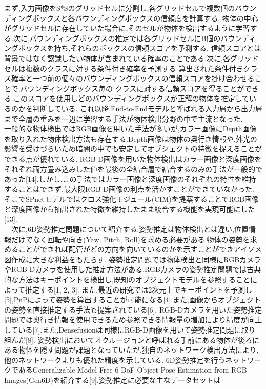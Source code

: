 まず,入力画像をS*Sのグリッドセルに分割し,各グリッドセルで複数個のバウンディングボックスと各バウンディングボックスの信頼度を計算する.
物体の中心がグリッドセルに存在していた場合に,そのセルが物体を検出するように学習する.次に,バウンディングボックスの推定では各グリッドセルにB個のバウンディングボックスを持ち,それらのボックスの信頼スコアを予測する.
信頼スコアとは背景ではなく認識したい物体が含まれている確率のことである.次に,各グリッドセルは複数のクラスに対する条件付き確率を予測する
算出された条件付きクラス確率と一つ前の個々のバウンディングボックスの信頼スコアを掛け合わせることで,バウンディングボックス毎の
クラスに対する信頼スコアを得ることができる.このスコアを使用しどのバウンディングボックスが正解の物体を推定しているのかを判断している.
これ以降,End-to-Endモデルと呼ばれる入力層から出力層まで全層の重みを一辺に学習する手法が物体検出分野の中で主流となった.\\
一般的な物体検出ではRGB画像を用いた手法が多いが,カラー画像にDepth画像を取り入れた物体検出方法も存在する.Depth画像は物体の奥行き情報や,外光の影響を受けづらいため暗闇の中でも安定してオブジェクトの特徴を捉えることができる点が優れている.
RGB-D画像を用いた物体検出はカラー画像と深度画像をそれぞれ両方畳み込みした値を最後の全結合層で結合するのみの手法が一般的であった[14].しかし,この手法ではカラー画像と深度画像のそれぞれの特性を維持することはできず,最大限RGB-D画像の利点を活かすことができていなかった.
そこでSPnetモデルではクロス強化モジュール(CIM)を提案することでRGB画像と深度画像から抽出された特徴を維持したまま統合する機能を実現可能にした[13].\\
　次に,6D姿勢推定問題について紹介する.姿勢推定は物体検出とは違い,位置情報だけでなく回転や向き(Yaw, Pitch, Roll)を求める必要がある.物体の姿勢を求めることができれば配管がどの方向を向いているのかを示すことができアイソメ図作成に大きな利益をもたらす.
姿勢推定問題では物体検出と同様にRGBカメラやRGB-Dカメラを使用した推定方法がある.RGBカメラの姿勢推定問題では古典的な方法はキーポイントを検出し,既知のオブジェクトモデルを参照することによって推定する[1, 2, 3].
また,最近の研究では2次元上でキーポイントを予測し[5],PnPによって姿勢を算出することが可能になる[4].また,画像からオブジェクトの姿勢を直接推定する手法も提案されている[6].
RGB-Dカメラを用いた姿勢推定問題では奥行き情報を使用できるため参照できる情報量の増加により精度が向上している[7].また,Densefusionは同様にRGB-D画像を用いて姿勢推定問題に取り組んだ[8].
姿勢検出においてオクルージョンと呼ばれる手前にある物体が後ろにある物体を隠す問題が課題となっていたが,独自のネットワーク検出方法により,他のネットワークよりも優れた精度を示している.
6D姿勢推定を行うネットワークであるGeneralizable Model-Free 6-DoF Object Pose Estimation from RGB Images(Gen6D)を紹介する[9].姿勢推定に必要な主なデータセットは
